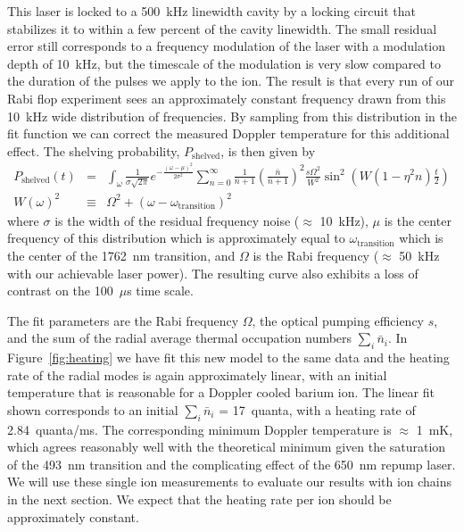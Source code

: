 This laser is locked to a 500~kHz linewidth cavity by a locking circuit that stabilizes it to within a few percent of the cavity linewidth.  The small residual error still corresponds to a frequency modulation of the laser with a modulation depth of 10~kHz, but the timescale of the modulation is very slow compared to the duration of the pulses we apply to the ion.  The result is that every run of our Rabi flop experiment sees an approximately constant frequency drawn from this 10~kHz wide distribution of frequencies.  By sampling from this distribution in the fit function we can correct the measured Doppler temperature for this additional effect.  The shelving probability, $P_{\mathrm{shelved}}$, is then given by
\begin{eqnarray}
	P_\mathrm{shelved}(t) &=& \int_\omega \frac{1}{\sigma \sqrt{2 \pi}} e^{-\frac{(\omega - \mu)^2 }{2 \sigma^2}} \sum\limits_{n=0}^\infty \frac{1}{\bar{n} + 1} \left( \frac{\bar{n}}{\bar{n} + 1} \right)^2 \frac{s \Omega^2}{W^2} \sin^2 \left( W (1 - \eta^2 n) \frac{t}{2} \right) \\
	W(\omega)^2 &\equiv& \Omega^2 + (\omega - \omega_\mathrm{transition})^2
\end{eqnarray}
where $\sigma$ is the width of the residual frequency noise ($\approx$ 10~kHz), $\mu$ is the center frequency of this distribution which is approximately equal to $\omega_\mathrm{transition}$ which is the center of the 1762~nm transition, and $\Omega$ is the Rabi frequency ($\approx$ 50~kHz with our achievable laser power).  The resulting curve also exhibits a loss of contrast on the 100~$\mu$s time scale.

The fit parameters are the Rabi frequency $\Omega$, the optical pumping efficiency $s$, and the sum of the radial average thermal occupation numbers $\sum_i \bar{n}_i$.  In Figure~\ref{fig:heating} we have fit this new model to the same data and the heating rate of the radial modes is again approximately linear, with an initial temperature that is reasonable for a Doppler cooled barium ion.  The linear fit shown corresponds to an initial $\sum_i \bar{n}_i$ = 17~quanta, with a heating rate of 2.84~quanta/ms.  The corresponding minimum Doppler temperature is $\approx$ 1~mK, which agrees reasonably well with the theoretical minimum given the saturation of the 493~nm transition and the complicating effect of the 650~nm repump laser.  We will use these single ion measurements to evaluate our results with ion chains in the next section.  We expect that the heating rate per ion should be approximately constant.

